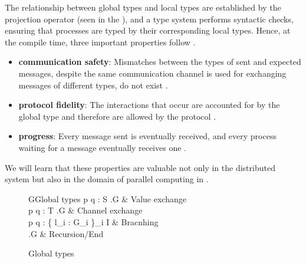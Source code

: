 The relationship between global types and local types are established by the projection operator (seen in the ), and a type system performs syntactic checks, ensuring that processes are typed by their corresponding local types. Hence, at the compile time, three important properties follow \cite{coppoGentleIntroductionMultiparty2015}. 
\begin{itemize}
  \item \textbf{communication safety}: Mismatches between the types of sent and expected messages, despite the same communication channel is used for exchanging messages of different types, do not exist \cite{coppoGentleIntroductionMultiparty2015}. 
  \item \textbf{protocol fidelity}: The interactions that occur are accounted for by the global type and therefore are allowed by the protocol \cite{coppoGentleIntroductionMultiparty2015}.
  \item \textbf{progress}: Every message sent is eventually received, and every process waiting for a message eventually receives one \cite{coppoGentleIntroductionMultiparty2015}.
\end{itemize}
We will learn that these properties are valuable not only in the distributed system but also in the domain of parallel computing in .
\begin{figure}[ht]
\centering
\begin{grammar}{G\Coloneqq}{Global types}
  p \rightarrow q : \langle S \rangle.G & Value exchange \\
  p \rightarrow q : \langle T \rangle.G & Channel exchange \\
  p \rightarrow q : \{ l_i : G_i \}_{i \in I} & Bracnhing \\
  \mu {}.G  \mid {} \mid {} & Recursion/End
\end{grammar}
\caption{Global types} \label{b:mpst:gt}
\end{figure}
